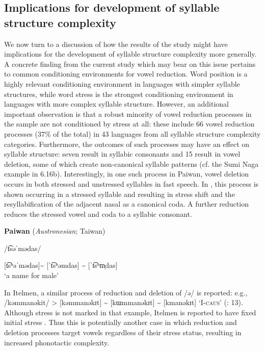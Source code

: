 \subsection{Implications for development of syllable structure complexity}\label{sec:6.4.2}

  We now turn to a discussion of how the results of the study might have implications for the development of syllable structure complexity more generally. A concrete finding from the current study which may bear on this issue pertains to common conditioning environments for vowel reduction. Word position is a highly relevant conditioning environment in languages with simpler syllable structures, while word stress is the strongest conditioning environment in languages with more complex syllable structure. However, an additional important observation is that a robust minority of vowel reduction processes in the sample are not conditioned by stress at all: these include 66 vowel reduction processes (37\% of the total) in 43 languages from all syllable structure complexity categories. Furthermore, the outcomes of such processes may have an effect on syllable structure: seven result in syllabic consonants and 15 result in vowel deletion, some of which create non-canonical syllable patterns (cf. the Sumi Naga example in 6.16b). Interestingly, in one such process in Paiwan, vowel deletion occurs in both stressed and unstressed syllables in fast speech. In , this process is shown occurring in a stressed syllable and resulting in stress shift and the resyllabification of the adjacent nasal as a canonical coda. A further reduction reduces the stressed vowel and coda to a syllabic consonant.

\ea\label{ex:6.21}
  \textbf{Paiwan} (\textit{Austronesian}; Taiwan)

/t͡səˈmədas/

[t͡sʰəˈmədas]{\textasciitilde} [ˈt͡sʰəmdas] {\textasciitilde} [ˈt͡sʰm̩das]\\
\glt ‘a name for male’
\citep[42]{Chang2006}
\z

In Itelmen, a similar process of reduction and deletion of /ə/ is reported: e.g., /kəmmanəkit/ > [kəmmanəkɪt] {\textasciitilde} [kɯmmanəkɪt] {\textasciitilde} [kmanəkɪt] ‘I-\textsc{caus}’ (\citealt{GeorgVolodin1999}: 13). Although stress is not marked in that example, Itelmen is reported to have fixed initial stress \citep[6]{Bobaljik2006}. Thus this is potentially another case in which reduction and deletion processes target vowels regardless of their stress status, resulting in increased phonotactic complexity. 


